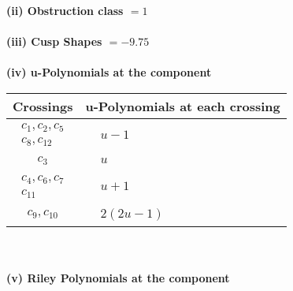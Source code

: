 \documentclass[1p]{elsarticle_modified}
\theoremstyle{definition}
\begin{document}
\flushleft \textbf{(ii) Obstruction class $= 1$}\\~\\
\flushleft \textbf{(iii) Cusp Shapes $= -9.75$}\\~\\
\newpage\renewcommand{\arraystretch}{1}
\flushleft \textbf{(iv) u-Polynomials at the component}\newline \\
\begin{tabular}{m{50pt}|m{274pt}}
Crossings & \hspace{64pt}u-Polynomials at each crossing \\
\hline $$\begin{aligned}c_{1},c_{2},c_{5}\\c_{8},c_{12}\end{aligned}$$&$\begin{aligned}
&u-1
\end{aligned}$\\
\hline $$\begin{aligned}c_{3}\end{aligned}$$&$\begin{aligned}
&u
\end{aligned}$\\
\hline $$\begin{aligned}c_{4},c_{6},c_{7}\\c_{11}\end{aligned}$$&$\begin{aligned}
&u+1
\end{aligned}$\\
\hline $$\begin{aligned}c_{9},c_{10}\end{aligned}$$&$\begin{aligned}
&2(2 u-1)
\end{aligned}$\\
\hline
\end{tabular}\\~\\
\newpage\renewcommand{\arraystretch}{1}
\flushleft \textbf{(v) Riley Polynomials at the component}\newline \\
\end{document}
